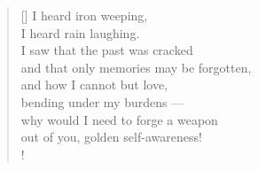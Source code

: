 \documentclass[a4paper,12pt,twoside,final]{book}
\begin{document}
\newpage


\settowidth{\versewidth}{and that only a memory can be forgotten;}

\begin{verse}[\versewidth]
  I heard iron weeping, \\
  I heard rain laughing. \\
  I saw that the past was cracked \\
  and that only memories may be forgotten, \\
  and how I cannot but love, \\
  bending under my burdens --- \\
  why would I need to forge a weapon \\
  out of you, golden self-awareness! \\!
\end{verse}






\newpage

\settowidth{\versewidth}{}
\end{document}

